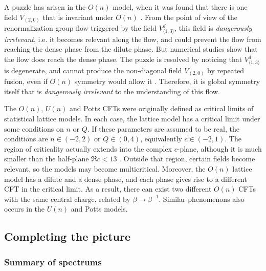 \documentclass[12pt, a4paper]{article}
\theoremstyle{break}
\begin{document}
A puzzle has arisen in the $O(n)$ model, when it was found that there is one field $V_{(2,0)}$ that is invariant under $O(n)$ \cite{gz20}. From the point of view of the renormalization group flow triggered by the field $V^d_{\langle 1,3\rangle}$, this field is \textit{dangerously irrelevant}, i.e. it becomes relevant along the flow, and could prevent the flow from reaching the dense phase from the dilute phase. But numerical studies show that the flow does reach the dense phase. The puzzle is resolved by noticing that $V^d_{\langle 1,3\rangle}$ is degenerate, and cannot produce the non-diagonal field $V_{(2,0)}$ by repeated fusion, even if $O(n)$ symmetry would allow it \cite{js23}. Therefore, it is global symmetry itself that is \textit{dangerously irrelevant} to the understanding of this flow. 

The $O(n)$, $U(n)$ and Potts CFTs were originally defined as critical limits of statistical lattice models. In each case, the lattice model has a critical limit under some conditions on $n$ or $Q$. If these parameters are assumed to be real, the conditions are $n\in (-2,2)$ or $Q\in (0,4)$, equivalently $c\in (-2,1)$. The region of criticality actually extends into the complex $c$-plane, although it is much smaller than the half-plane $\Re c<13$ \cite{bjjz22}. Outside that region, certain fields become relevant, so the models may become multicritical. Moreover, the $O(n)$ lattice model has a dilute and a dense phase, and each phase gives rise to a different CFT in the critical limit. As a result, there can exist two different $O(n)$ CFTs with the same central charge, related by $\beta \to\beta^{-1}$. Similar phenomenons also occurs in the $U(n)$ and Potts models.

\subsection{Completing the picture}

\subsubsection{Summary of spectrums}
\end{document}
